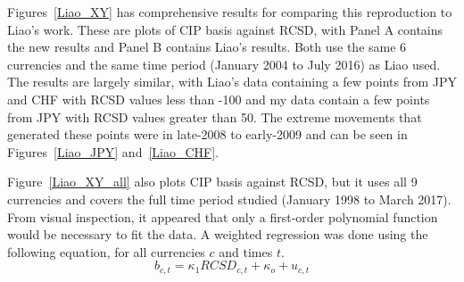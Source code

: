 


 


Figures~\ref{Liao_XY} has comprehensive results for comparing this reproduction to Liao's work.  These are plots of CIP basis against RCSD, with Panel A contains the new results and Panel B contains Liao's results.  Both use the same 6 currencies and the same time period  (January 2004 to July 2016) as Liao used.  The results are largely similar, with Liao's data containing a few points from JPY and CHF with RCSD values less than -100 and my data contain a few points from JPY with RCSD values greater than 50.  The extreme movements that generated these points were in late-2008 to early-2009 and can be seen in Figures~\ref{Liao_JPY} and~\ref{Liao_CHF}.

Figure~\ref{Liao_XY_all} also plots CIP basis against RCSD, but it uses all 9 currencies and covers the full time period studied (January 1998 to March 2017).  From visual inspection, it appeared that only a first-order polynomial function would be necessary to fit the data.  A weighted regression was done using the following equation, for all currencies $c$ and times $t$.
\begin{equation}
  \label{F-test-eqn}
  b_{c, t} = \kappa_1RCSD_{c,t} + \kappa_o + u_{c,t}
\end{equation}

